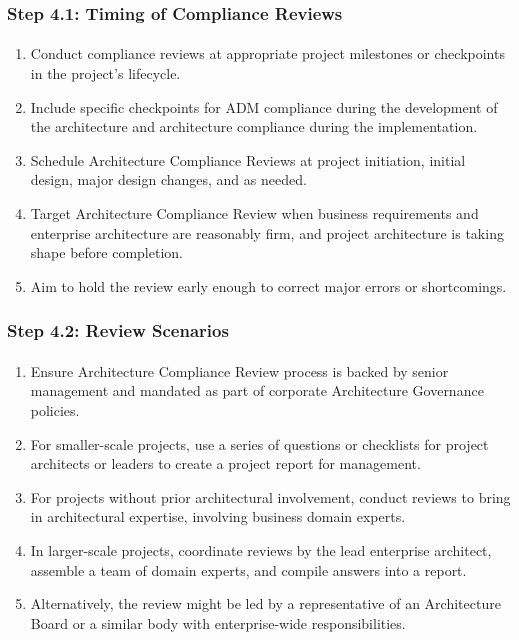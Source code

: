 \documentclass[aspectratio=169, table]{beamer}
\begin{document}
	\begin{frame}
		\frametitle{Step 4.1: Timing of Compliance Reviews}
		\framesubtitle{\hspace{1cm}}
		\vspace{20pt}
		\begin{enumerate}
			\item Conduct compliance reviews at appropriate project milestones or checkpoints in the project's lifecycle.
			\item Include specific checkpoints for ADM compliance during the development of the architecture and architecture compliance during the implementation.
			\item Schedule Architecture Compliance Reviews at project initiation, initial design, major design changes, and as needed.
			\item Target Architecture Compliance Review when business requirements and enterprise architecture are reasonably firm, and project architecture is taking shape before completion.
			\item Aim to hold the review early enough to correct major errors or shortcomings.
		\end{enumerate}
		
	\end{frame}

	\begin{frame}
		\frametitle{Step 4.2: Review Scenarios}
		\framesubtitle{\hspace{1cm}}
		\vspace{20pt}
		\begin{enumerate}
			\item Ensure Architecture Compliance Review process is backed by senior management and mandated as part of corporate Architecture Governance policies.
			\item For smaller-scale projects, use a series of questions or checklists for project architects or leaders to create a project report for management.
			\item For projects without prior architectural involvement, conduct reviews to bring in architectural expertise, involving business domain experts.
			\item In larger-scale projects, coordinate reviews by the lead enterprise architect, assemble a team of domain experts, and compile answers into a report.
			\item Alternatively, the review might be led by a representative of an Architecture Board or a similar body with enterprise-wide responsibilities.
		\end{enumerate}
	\end{frame}
\end{document}
